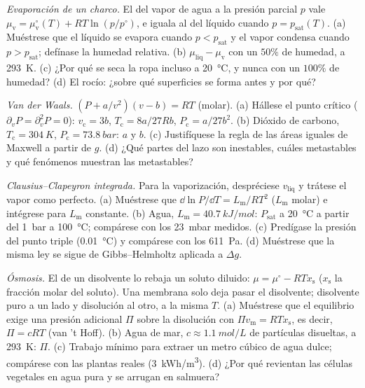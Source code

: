 \begin{exercise}[$\star\star$]\label{exo:b2:thermodynamic-potentials:8}
\emph{Evaporación de un charco.} El  del vapor de agua
a la presión parcial $p$ vale $\mu_{\text{v}} = \mu_{\text{v}}^\circ(T) +
RT\ln(p/p^\circ)$, e iguala al del líquido cuando $p = p_{\text{sat}}(T)$.
(a) Muéstrese que el líquido se evapora cuando $p < p_{\text{sat}}$ y el vapor
condensa cuando $p > p_{\text{sat}}$; defínase la humedad relativa. (b)
$\mu_{\text{liq}} - \mu_{\text{v}}$ con un $50\%$ de humedad, a \qty{293}{K}. (c) ¿Por qué
se seca la ropa incluso a \qty{20}{\celsius}, y nunca con un $100\%$ de humedad?
(d) El rocío: ¿sobre qué superficies se forma antes y por qué?
\end{exercise}

\begin{exercise}[$\star\star$]\label{exo:b2:thermodynamic-potentials:9}
\emph{Van der Waals.} $(P + a/v^2)(v - b) = RT$ (molar). (a) Hállese el
punto crítico ($\partial_vP = \partial_v^2P = 0$): $v_{\text{c}} = 3b$,
$T_{\text{c}} = 8a/27Rb$, $P_{\text{c}} = a/27b^2$. (b) Dióxido de carbono,
$T_{\text{c}} = \qty{304}{K}$, $P_{\text{c}} = \qty{73.8}{bar}$: $a$ y $b$. (c)
Justifíquese la regla de las áreas iguales de Maxwell a partir de $g$. (d) ¿Qué partes del lazo
son inestables, cuáles metastables y qué fenómenos muestran las metastables?
\end{exercise}

\begin{exercise}[$\star\star\star$]\label{exo:b2:thermodynamic-potentials:10}
\emph{Clausius--Clapeyron integrada.} Para la vaporización, despréciese $v_{\text{liq}}$
y trátese el vapor como perfecto. (a) Muéstrese que $\dd\ln P/\dd T = L_{\text{m}}/RT^2$
($L_{\text{m}}$ molar) e intégrese para $L_{\text{m}}$ constante. (b) Agua,
$L_{\text{m}} = \qty{40.7}{kJ/mol}$: $P_{\text{sat}}$ a \qty{20}{\celsius} a partir del
\qty{1}{bar} a \qty{100}{\celsius}; compárese con los \qty{23}{mbar} medidos.
(c) Predígase la presión del punto triple (\qty{0.01}{\celsius}) y compárese
con los \qty{611}{Pa}. (d) Muéstrese que la misma ley se sigue de Gibbs--Helmholtz
aplicada a $\Delta g$.
\end{exercise}

\begin{exercise}[$\star\star\star$]\label{exo:b2:thermodynamic-potentials:11}
\emph{Ósmosis.} El  de un disolvente lo rebaja un
soluto diluido: $\mu = \mu^\circ - RTx_{\text{s}}$ ($x_{\text{s}}$ la fracción molar
del soluto). Una membrana solo deja pasar el disolvente; disolvente puro a
un lado y disolución al otro, a la misma $T$. (a) Muéstrese que el equilibrio
exige una presión adicional $\Pi$ sobre la disolución con $\Pi v_{\text{m}} =
RTx_{\text{s}}$, es decir, $\Pi = cRT$ (van 't Hoff). (b) Agua de mar, $c \approx
\qty{1.1}{mol/L}$ de partículas disueltas, a \qty{293}{K}: $\Pi$. (c) Trabajo mínimo
para extraer un metro cúbico de agua dulce; compárese con las plantas reales
(\qty{3}{kWh/m^3}). (d) ¿Por qué revientan las células vegetales en agua pura y
se arrugan en salmuera?
\end{exercise}

